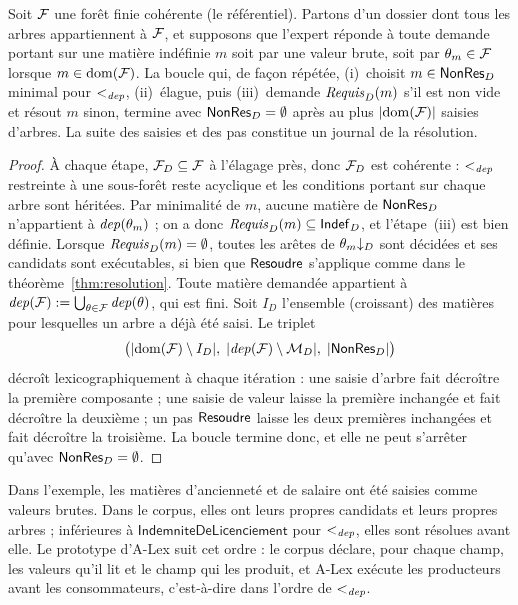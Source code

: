 \documentclass[review]{jflart}
\newcommand{\ALex}{A-Lex}
\renewcommand{\Indem}{\ensuremath{\mathsf{IndemniteDeLicenciement}}}
\begin{document}
\begin{coro}\label{cor:loop}
Soit \(\mathcal{F}\) une forêt finie cohérente (le référentiel). Partons d'un dossier dont tous les arbres appartiennent à \(\mathcal{F}\),
et supposons que l'expert réponde à toute demande portant sur une matière
indéfinie \(m\) soit par une valeur brute, soit par \(\theta_m\in\mathcal{F}\)
lorsque \(m\in\mathrm{dom}(\mathcal{F})\). La boucle qui, de façon répétée,
(i)~choisit \(m\in\mathsf{NonRes}_D\) minimal pour \(<_{\mathit{dep}}\), (ii)~élague, puis
(iii)~demande \(\mathit{Requis}_D(m)\) s'il est non vide et résout \(m\) sinon,
termine avec \(\mathsf{NonRes}_D=\emptyset\) après au plus \(|\mathrm{dom}(\mathcal{F})|\)
saisies d'arbres. La suite des saisies et des pas constitue un journal de la
résolution.
\end{coro}
\begin{proof}
À chaque étape, \(\mathcal{F}_D\subseteq\mathcal{F}\) à l'élagage près, donc \(\mathcal{F}_D\)
est cohérente : \(<_{\mathit{dep}}\) restreinte à une sous-forêt reste acyclique et les
conditions portant sur chaque arbre sont héritées. Par minimalité de \(m\),
aucune matière de \(\mathsf{NonRes}_D\) n'appartient à \(\mathit{dep}(\theta_m)\) ; on a donc
\(\mathit{Requis}_D(m)\subseteq\mathsf{Indef}_D\), et l'étape~(iii) est bien définie. Lorsque
\(\mathit{Requis}_D(m)=\emptyset\), toutes les arêtes de \({\theta_m}{\downarrow_D}\) sont
décidées et ses candidats sont exécutables, si bien que \(\mathsf{Resoudre}\) s'applique
comme dans le théorème~\ref{thm:resolution}. Toute matière demandée appartient
à \(\mathit{dep}(\mathcal{F}):=\bigcup_{\theta\in\mathcal{F}}\mathit{dep}(\theta)\), qui est fini. Soit
\(I_D\) l'ensemble (croissant) des matières pour lesquelles un arbre a déjà
été saisi. Le triplet
\[
 \bigl(|\mathrm{dom}(\mathcal{F})\setminus I_D|,\;
       |\mathit{dep}(\mathcal{F})\setminus\mathcal{M}_D|,\;
       |\mathsf{NonRes}_D|\bigr)
\]
décroît lexicographiquement à chaque itération : une saisie d'arbre fait
décroître la première composante ; une saisie de valeur laisse la première
inchangée et fait décroître la deuxième ; un pas \(\mathsf{Resoudre}\) laisse les deux
premières inchangées et fait décroître la troisième. La boucle termine donc,
et elle ne peut s'arrêter qu'avec \(\mathsf{NonRes}_D=\emptyset\).
\end{proof}

Dans l'exemple, les matières d'ancienneté et de salaire ont été saisies comme
valeurs brutes. Dans le corpus, elles ont leurs propres candidats et leurs propres
arbres ; inférieures à \(\Indem\) pour \(<_{\mathit{dep}}\), elles sont résolues avant
elle.
Le prototype d'\ALex{} suit cet ordre : le corpus déclare, pour chaque champ,
les valeurs qu'il lit et le champ qui les produit, et \ALex{} exécute les
producteurs avant les consommateurs, c'est-à-dire dans l'ordre de
\(<_{\mathit{dep}}\).
\end{document}
